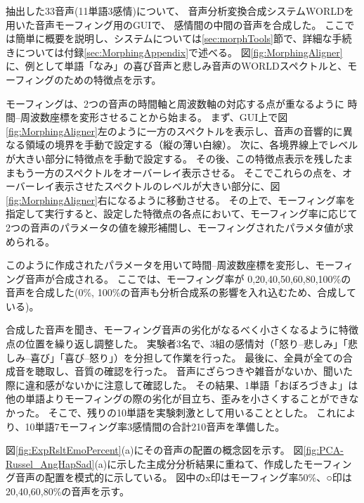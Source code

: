 抽出した33音声(11単語\time 3感情)について、
音声分析変換合成システムWORLD\cite{morise2016world}を用いた音声モーフィング用のGUI\cite{kawahara2024interactive}で、
感情間の中間の音声を合成した。
ここでは簡単に概要を説明し、システムについては\ref{sec:morphTools}節で、詳細な手続きについては付録\ref{sec:MorphingAppendix}で述べる。
図\ref{fig:MorphingAligner}に、例として単語「なみ」の喜び音声と悲しみ音声のWORLDスペクトルと、モーフィングのための特徴点を示す。

モーフィングは、2つの音声の時間軸と周波数軸の対応する点が重なるように
時間--周波数座標を変形させることから始まる。
まず、GUI上で図\ref{fig:MorphingAligner}左のように一方のスペクトルを表示し、音声の音響的に異なる領域の境界を手動で設定する（縦の薄い白線）。
次に、各境界線上でレベルが大きい部分に特徴点を手動で設定する。
その後、この特徴点表示を残したままもう一方のスペクトルをオーバーレイ表示させる。
そこでこれらの点を、オーバーレイ表示させたスペクトルのレベルが大きい部分に、図\ref{fig:MorphingAligner}右になるように移動させる。
その上で、モーフィング率を指定して実行すると、設定した特徴点の各点において、モーフィング率に応じて2つの音声のパラメータの値を線形補間し、モーフィングされたパラメタ値が求められる。

このように作成されたパラメータを用いて時間--周波数座標を変形し、モーフィング音声が合成される。
ここでは、モーフィング率が 0,20,40,50,60,80,100\%の音声を合成した(0\%, 100\%の音声も分析合成系の影響を入れ込むため、合成している)。

合成した音声を聞き、モーフィング音声の劣化がなるべく小さくなるように特徴点の位置を繰り返し調整した。
実験者3名で、3組の感情対（「怒り--悲しみ」「悲しみ--喜び」「喜び--怒り」）を分担して作業を行った。
最後に、全員が全ての合成音を聴取し、音質の確認を行った。
音声にざらつきや雑音がないか、聞いた際に違和感がないかに注意して確認した。
その結果、1単語「おぼろづきよ」は他の単語よりモーフィングの際の劣化が目立ち、歪みを小さくすることができなかった。
そこで、残りの10単語を実験刺激として用いることとした。
これにより、10単語\time 7モーフィング率\time 3感情間の合計210音声を準備した。

図\ref{fig:ExpRsltEmoPercent}(a)にその音声の配置の概念図を示す。
図\ref{fig:PCA-Russel_AngHapSad}(a)に示した主成分分析結果に重ねて、作成したモーフィング音声の配置を模式的に示している。
図中のx印はモーフィング率50\%、○印は20,40,60,80\%の音声を示す。
  


